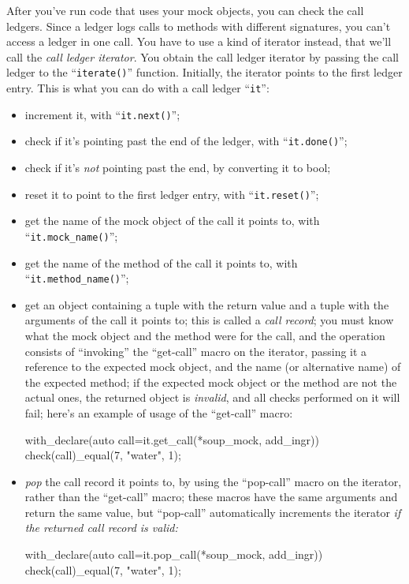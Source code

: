 \documentclass[twoside, a4paper, article]{memoir}
\begin{document}
After you've run code that uses your mock objects, you can check the call
ledgers.  Since a ledger logs calls to methods with different signatures, you
can't access a ledger in one call.  You have to use a kind of iterator instead,
that we'll call the \emph{call ledger iterator}.  You obtain the call ledger
iterator by passing the call ledger to the ``\texttt{iterate()}''
function.  Initially, the iterator points to the first ledger entry.  This is
what you can do with a call ledger ``\texttt{it}'':
\begin{itemize}
\item increment it, with ``\texttt{it.next()}'';
\item check if it's pointing past the end of the ledger, with
  ``\texttt{it.done()}'';
\item check if it's \emph{not} pointing past the end, by converting it to bool;
\item reset it to point to the first ledger entry, with
  ``\texttt{it.reset()}'';
\item get the name of the mock object of the call it points to, with
  ``\texttt{it.mock\_name()}'';
\item get the name of the method of the call it points to, with
  ``\texttt{it.method\_name()}'';
\item get an object containing a tuple with the return value and a tuple with
  the arguments of the call it points to; this is called a \emph{call record};
  you must know what the mock object and the method were for the call, and the
  operation consists of ``invoking'' the ``get-call'' macro on the iterator,
  passing it a reference to the expected mock object, and the name (or
  alternative name) of the expected method; if the expected mock object or the
  method are not the actual ones, the returned object is \emph{invalid}, and
  all checks performed on it will fail; here's an example of usage of the
  ``get-call'' macro:
\begin{cpplisting}
with_declare(auto call=it.get_call(*soup_mock, add_ingr))
  check(call)_equal({7}, {"water", 1});
\end{cpplisting}
\item \emph{pop} the call record it points to, by using the ``pop-call'' macro
  on the iterator, rather than the ``get-call'' macro; these macros have the
  same arguments and return the same value, but ``pop-call'' automatically
  increments the iterator \emph{if the returned call record is valid:}
\begin{cpplisting}
with_declare(auto call=it.pop_call(*soup_mock, add_ingr))
  check(call)_equal({7}, {"water", 1});
\end{cpplisting}
\end{itemize}
\end{document}
